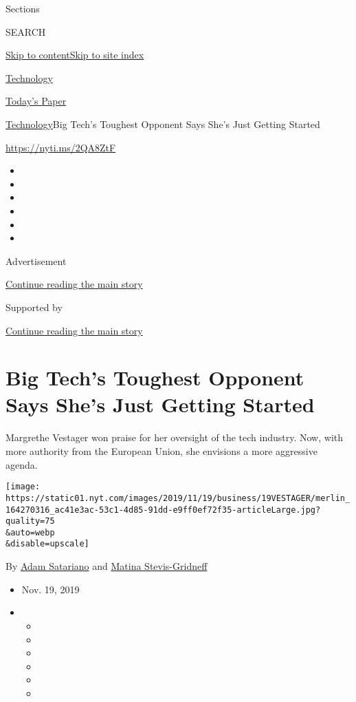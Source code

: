 Sections

SEARCH

\protect\hyperlink{site-content}{Skip to
content}\protect\hyperlink{site-index}{Skip to site index}

\href{https://www.nytimes.com/section/technology}{Technology}

\href{https://myaccount.nytimes.com/auth/login?response_type=cookie\&client_id=vi}{}

\href{https://www.nytimes.com/section/todayspaper}{Today's Paper}

\href{/section/technology}{Technology}\textbar{}Big Tech's Toughest
Opponent Says She's Just Getting Started

\url{https://nyti.ms/2QA8ZtF}

\begin{itemize}
\item
\item
\item
\item
\item
\item
\end{itemize}

Advertisement

\protect\hyperlink{after-top}{Continue reading the main story}

Supported by

\protect\hyperlink{after-sponsor}{Continue reading the main story}

\hypertarget{big-techs-toughest-opponent-says-shes-just-getting-started}{%
\section{Big Tech's Toughest Opponent Says She's Just Getting
Started}\label{big-techs-toughest-opponent-says-shes-just-getting-started}}

Margrethe Vestager won praise for her oversight of the tech industry.
Now, with more authority from the European Union, she envisions a more
aggressive agenda.

\texttt{[image: https://static01.nyt.com/images/2019/11/19/business/19VESTAGER/merlin\_164270316\_ac41e3ac-53c1-4d85-91dd-e9ff0ef72f35-articleLarge.jpg?quality=75\\\&auto=webp\\\&disable=upscale]}

By \href{https://www.nytimes.com/by/adam-satariano}{Adam Satariano} and
\href{https://www.nytimes.com/by/matina-stevis-gridneff}{Matina
Stevis-Gridneff}

\begin{itemize}
\item
  Nov. 19, 2019
\item
  \begin{itemize}
  \item
  \item
  \item
  \item
  \item
  \item
  \end{itemize}
\end{itemize}

